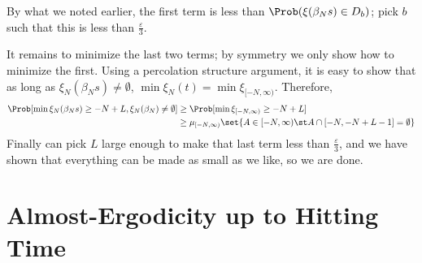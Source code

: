 \documentclass{scrartcl}
\newcommand{\ep}{\varepsilon}
\begin{document}
By what we noted earlier, the first term is less than $\Prob(\xi(\beta_{N}s) \in D_{b})$; pick $b$ such that this is less than $\frac{\ep}{3}$.

It remains to minimize the last two terms; by symmetry we only show how to minimize the first. Using a percolation structure argument, it is easy to show that as long as $\xi_{N}(\beta_{N}s) \neq \emptyset$, $\min \xi_{N}(t) = \min \xi_{[-N,\infty)}$. Therefore,
\begin{align*}
  \Prob[\min \xi_{N}(\beta_{N}s) \geq -N + L, \xi_{N}(\beta_{N}) \neq \emptyset] &\geq \Prob[\min \xi_{[-N,\infty)} \geq -N+L] \\
  &\geq \mu_{[-N,\infty)}\set{A \in [-N,\infty) \st A \cap [-N,-N+L-1] = \emptyset}
\end{align*}
Finally can pick $L$ large enough to make that last term less than $\frac{\ep}{3}$, and we have shown that everything can be made as small as we like, so we are done.

\section{Almost-Ergodicity up to Hitting Time}
\end{document}
